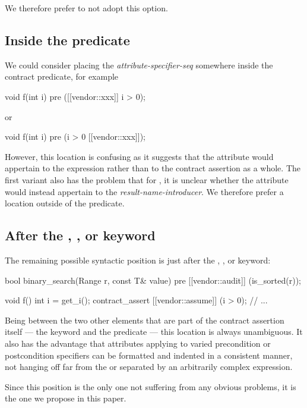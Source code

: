 We therefore prefer to not adopt this option.

\subsection{Inside the predicate}

We could consider placing the  \emph{attribute-specifier-seq} somewhere inside the contract predicate, for example
\begin{codeblock}
void f(int i) 
  pre ([[vendor::xxx]] i > 0);
\end{codeblock}
or
\begin{codeblock}
void f(int i) 
  pre (i > 0 [[vendor::xxx]]);
\end{codeblock}
However, this location is confusing as it suggests that the attribute would appertain to the expression rather than to the contract assertion as a whole. The  first variant also has the problem that for , it is unclear whether the attribute would instead appertain to the \emph{result-name-introducer}. We therefore prefer a location outside of the predicate.

\subsection{After the , , or  keyword}

The remaining possible syntactic position is just after the , , or  keyword:

\begin{codeblock}
bool binary_search(Range r, const T& value)
  pre [[vendor::audit]] (is_sorted(r));
  
void f() {
  int i = get_i();
  contract_assert [[vendor::assume]] (i > 0);
  // ...
}
\end{codeblock}

Being between the two other elements that are part of the contract assertion itself --- the keyword and the predicate --- this location is always unambiguous. It also has the advantage that attributes applying to varied precondition or postcondition specifiers can be formatted and indented in a consistent manner, not hanging off far from the  or  separated by an arbitrarily complex expression.

Since this position is the only one not suffering from any obvious problems, it is the one we propose in this paper.

